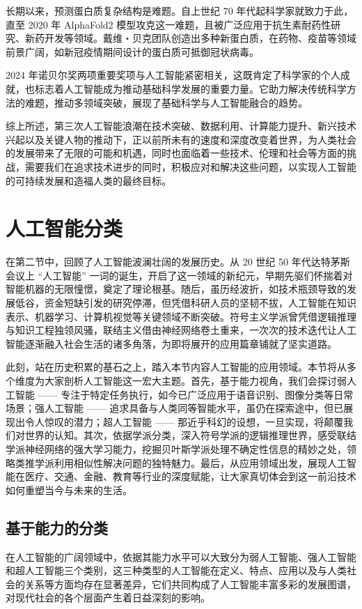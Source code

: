 长期以来，预测蛋白质复杂结构是难题。自上世纪 70 年代起科学家就致力于此，直至 2020 年 AlphaFold2 模型攻克这一难题，且被广泛应用于抗生素耐药性研究、新药开发等领域。戴维・贝克团队创造出多种新蛋白质，在药物、疫苗等领域前景广阔，如新冠疫情期间设计的蛋白质可抵御冠状病毒。


2024 年诺贝尔奖两项重要奖项与人工智能紧密相关，这既肯定了科学家的个人成就，也标志着人工智能成为推动基础科学发展的重要力量。它助力解决传统科学方法的难题，推动多领域突破，展现了基础科学与人工智能融合的趋势。


综上所述，第三次人工智能浪潮在技术突破、数据利用、计算能力提升、新兴技术兴起以及关键人物的推动下，正以前所未有的速度和深度改变着世界，为人类社会的发展带来了无限的可能和机遇，同时也面临着一些技术、伦理和社会等方面的挑战，需要我们在追求技术进步的同时，积极应对和解决这些问题，以实现人工智能的可持续发展和造福人类的最终目标。


\section{人工智能分类}


在第二节中，回顾了人工智能波澜壮阔的发展历史。从 20 世纪 50 年代达特茅斯会议上 “人工智能” 一词的诞生，开启了这一领域的新纪元，早期先驱们怀揣着对智能机器的无限憧憬，奠定了理论根基。随后，虽历经波折，如技术瓶颈导致的发展低谷，资金短缺引发的研究停滞，但凭借科研人员的坚韧不拔，人工智能在知识表示、机器学习、计算机视觉等关键领域不断突破。符号主义学派曾凭借逻辑推理与知识工程独领风骚，联结主义借由神经网络卷土重来，一次次的技术迭代让人工智能逐渐融入社会生活的诸多角落，为即将展开的应用篇章铺就了坚实道路。


此刻，站在历史积累的基石之上，踏入本节内容人工智能的应用领域。本节将从多个维度为大家剖析人工智能这一宏大主题。首先，基于能力视角，我们会探讨弱人工智能 —— 专注于特定任务执行，如今已广泛应用于语音识别、图像分类等日常场景；强人工智能 —— 追求具备与人类同等智能水平，虽仍在探索途中，但已展现出令人惊叹的潜力；超人工智能 —— 那近乎科幻的设想，一旦实现，将颠覆我们对世界的认知。其次，依据学派分类，深入符号学派的逻辑推理世界，感受联结学派神经网络的强大学习能力，挖掘贝叶斯学派处理不确定性信息的精妙之处，领略类推学派利用相似性解决问题的独特魅力。最后，从应用领域出发，展现人工智能在医疗、交通、金融、教育等行业的深度赋能，让大家真切体会到这一前沿技术如何重塑当今与未来的生活。


\subsection{基于能力的分类}
在人工智能的广阔领域中，依据其能力水平可以大致分为弱人工智能、强人工智能和超人工智能三个类别，这三种类型的人工智能在定义、特点、应用以及与人类社会的关系等方面均存在显著差异，它们共同构成了人工智能丰富多彩的发展图谱，对现代社会的各个层面产生着日益深刻的影响。




